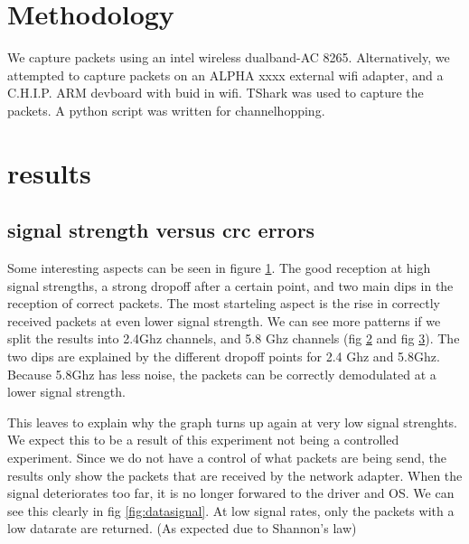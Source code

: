 \documentclass{article}
\begin{document}
\section{Methodology}

We capture packets using an intel wireless dualband-AC 8265. Alternatively, we attempted to capture packets on an ALPHA xxxx external wifi adapter, and a C.H.I.P. ARM devboard with buid in wifi.
TShark was used to capture the packets. A python script was written for channelhopping.


\section{results}

\subsection{signal strength versus crc errors}

\begin{figure}
		\caption{}
		\label{fig:totalpackets}
\end{figure}

Some interesting aspects can be seen in figure \ref{fig:totalpackets}. The good reception at high signal strengths, a strong dropoff after a certain point, and two main dips in the reception of correct packets. The most starteling aspect is the rise in correctly received packets at even lower signal strength. We can see more patterns if we split the results into 2.4Ghz channels, and 5.8 Ghz channels (fig \ref{fig:24packets} and fig \ref{fig:58packets}). The two dips are explained by the different dropoff points for 2.4 Ghz and 5.8Ghz. Because 5.8Ghz has less noise, the packets can be correctly demodulated at a lower signal strength.

\begin{figure}
		\caption{}
		\label{fig:24packets}
\end{figure}

\begin{figure}
		\caption{}
		\label{fig:58packets}
\end{figure}

This leaves to explain why the graph turns up again at very low signal strenghts. We expect this to be a result of this experiment not being a controlled experiment. Since we do not have a control of what packets are being send, the results only show the packets that are received by the network adapter. When the signal deteriorates too far, it is no longer forwared to the driver and OS. We can see this clearly in fig \ref{fig:datasignal}. At low signal rates, only the packets with a low datarate are returned. (As expected due to Shannon's law)
\end{document}

